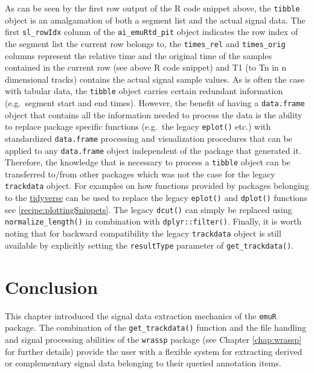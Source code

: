 \documentclass[]{book}
\begin{document}
As can be seen by the first row output of the R code snippet above, the \texttt{tibble} object is an amalgamation of both a segment list and the actual signal data. The first \texttt{sl\_rowIdx} column of the \texttt{ai\_emuRtd\_pit} object indicates the row index of the segment list the current row belongs to, the \texttt{times\_rel} and \texttt{times\_orig} columns represent the relative time and the original time of the samples contained in the current row (see above R code snippet) and T1 (to Tn in n dimensional tracks) contains the actual signal sample values. As is often the case with tabular data, the \texttt{tibble} object carries certain redundant information (e.g.~segment start and end times). However, the benefit of having a \texttt{data.frame} object that contains all the information needed to process the data is the ability to replace package specific functions (e.g.~the legacy \texttt{eplot()} etc.) with standardized \texttt{data.frame} processing and visualization procedures that can be applied to any \texttt{data.frame} object independent of the package that generated it. Therefore, the knowledge that is necessary to process a \texttt{tibble} object can be transferred to/from other packages which was not the case for the legacy \texttt{trackdata} object. For examples on how functions provided by packages belonging to the \href{https://www.tidyverse.org/}{tidyverse} can be used to replace the legacy \texttt{eplot()} and \texttt{dplot()} functions see \ref{recipe:plottingSnippets}. The legacy \texttt{dcut()} can simply be replaced using \texttt{normalize\_length()} in combination with \texttt{dplyr::filter()}. Finally, it is worth noting that for backward compatibility the legacy \texttt{trackdata} object is still available by explicitly setting the \texttt{resultType} parameter of \texttt{get\_trackdata()}.

\hypertarget{conclusion-3}{%
\section{Conclusion}\label{conclusion-3}}

This chapter introduced the signal data extraction mechanics of the \texttt{emuR} package. The combination of the \texttt{get\_trackdata()} function and the file handling and signal processing abilities of the \texttt{wrassp} package (see Chapter \ref{chap:wrassp} for further details) provide the user with a flexible system for extracting derived or complementary signal data belonging to their queried annotation items.
\end{document}
